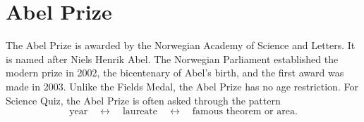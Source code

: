     \section*{Abel Prize}

    The Abel Prize is awarded by the Norwegian Academy of Science and Letters.
    It is named after Niels Henrik Abel. The Norwegian Parliament established
    the modern prize in 2002, the bicentenary of Abel's birth, and the first
    award was made in 2003. Unlike the Fields Medal, the Abel Prize has no age
    restriction. For Science Quiz, the Abel Prize is often asked through the pattern
    \[
        \text{year} \quad \longleftrightarrow \quad \text{laureate} \quad
        \longleftrightarrow \quad \text{famous theorem or area}.
    \]

    \vspace{1em}

